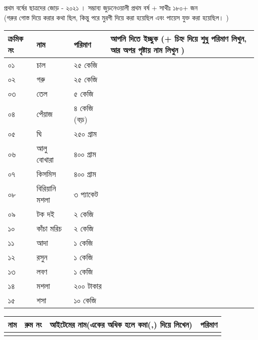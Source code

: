 \documentclass[12pt]{article}
\newcommand{\aline}{\\\hline \arabic{theyflines} &&&\rule{0cm}{0.99cm}}
\begin{document}
\begin{center}
\end{center}
\noindent
\bgroup
\def\arraystretch{2.5}
\begin{center}প্রথম বর্ষের ছাত্রদের জোড় - ২০২১ । সম্ভাব্য জুড়নেওয়ালী প্রথম বর্ষ + সাথীঃ ১৮০+ জন\\
    (গরুর গোস্ত দিয়ে করার কথা ছিল, কিন্তু পরে মুরগী দিয়ে করা হয়েছিল এবং পায়েস যুক্ত করা হয়েছিল। )\end{center}
\begin{tabular}{@{}lll|p{15cm}}
\toprule
ক্রমিক নং &  নাম &  পরিমাণ & আপনি দিতে ইচ্ছুক (+ চিহ্ন দিয়ে শুধু পরিমাণ লিখুন, আর অপর পৃষ্টায় নাম লিখুন )\\
\toprule
০১ & চাল & ২৫ কেজি &\\
\hline
০২ & গরু & ২৫ কেজি &\\
\hline
০৩ & তেল & ৫ কেজি &\\
\hline
০৪ & পেঁয়াজ & ৪ কেজি (বড়) &\\
\hline
০৫ & ঘি & ২৫০ গ্রাম &\\
\hline
০৬ & আলু বোখারা & ৪০০ গ্রাম &\\
\hline
০৭ & কিসমিস & ৪০০ গ্রাম &\\
\hline
০৮ & বিরিয়ানি মশলা & ৩ প্যাকেট &\\
\hline
০৯ & টক দই & ২ কেজি &\\
\hline
১০ & কাঁচা মরিচ & ২ কেজি &\\
\hline
১১ & আদা & ১ কেজি &\\
\hline
১২ & রসুন & ১ কেজি &\\
\hline
১৩ & লবণ & ১ কেজি &\\
\hline
১৪ & মশলা & ২০০ টাকার &\\
\hline
১৫ & শসা & ১০ কেজি &\\
\bottomrule
\end{tabular}
\egroup
\newpage
\noindent
\begin{tabular}{|p{5cm}|p{2cm}|p{7cm}|p{5cm}|}
\toprule
নাম & রুম নং & আইটেমের নাম(একের অধিক হলে কমা(,) দিয়ে লিখেন) & পরিমাণ
\forloop{theyflines}{1}{\value{theyflines} < 26}{\aline}\\
\toprule
\end{tabular}
\end{document}
